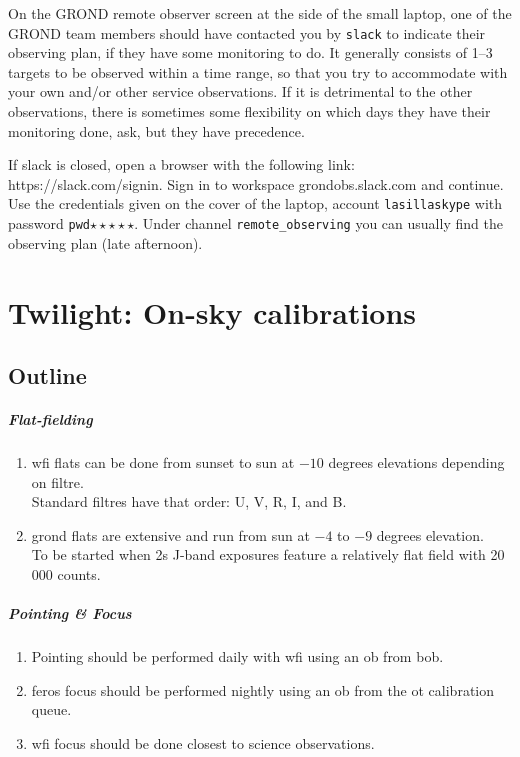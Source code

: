 \documentclass[11pt,fleqn]{book}
\begin{document}
On the GROND remote observer screen at the side of the small laptop, one of the GROND team members should have contacted you by \texttt{slack} to indicate their observing plan, if they have some monitoring to do.  It generally consists of 1--3 targets to be observed within a time range, so that you try to accommodate with your own and/or other service observations.  If it is detrimental to the other observations, there is sometimes some flexibility on which days they have their monitoring done, ask, but they have precedence.

If slack is closed, open a browser with the following link: https://slack.com/signin. Sign in to workspace grondobs.slack.com and continue. Use the credentials given on the cover of the laptop, account \texttt{lasillaskype} with password \texttt{pwd}$\star\star\star\star\star$. Under channel \texttt{remote\_observing} you can usually find the observing plan (late afternoon). 



\chapter{Twilight: On-sky calibrations}
\label{nightcal}


\section{Outline}

\paragraph{Flat-fielding}
\begin{enumerate}
  \item \gls{wfi} flats can be done from sunset to sun at $-10$ degrees elevations depending on filtre.\\
        Standard filtres have that order: U, V, R, I, and B.
  \item \gls{grond} flats are extensive and run from sun at $-4$ to $-9$ degrees elevation.\\
        To be started when 2s J-band exposures feature a
        relatively flat field with 20\,000 counts.
\end{enumerate}

\paragraph{Pointing \& Focus}
\begin{enumerate}
  \item Pointing should be performed daily with \gls{wfi}
        using an \gls{ob} from \gls{bob}.
  \item \gls{feros} focus should be performed nightly using an \gls{ob} from
        the \gls{ot} calibration queue.
  \item \gls{wfi} focus should be done closest to science observations.
\end{enumerate} 
\end{document}
